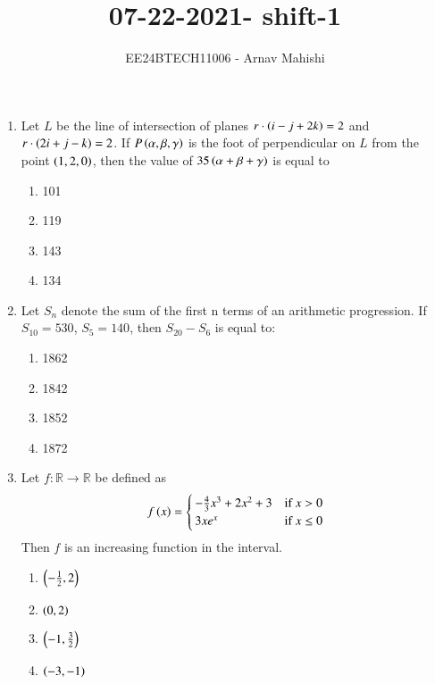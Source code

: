 \documentclass[journal]{IEEEtran}
\begin{document}

\vspace{3cm}

\title{07-22-2021- shift-1}
\author{EE24BTECH11006 - Arnav Mahishi}
{\let\newpage\relax\maketitle}
\begin{enumerate}
\item{
Let $L$ be the line of intersection of planes $r\cdot\left(i-j+2k\right) = 2$ and $r \cdot\left(2i + j - k\right) = 2$. If $P\left(\alpha, \beta, \gamma\right)$ is the foot of perpendicular on $L$ from the point $\left(1, 2, 0\right)$, then the value of $35\left(\alpha + \beta + \gamma\right)$ is equal to
\begin{multicols}{4}
\begin{enumerate}
\item101
\item119
\item143
\item134
\end{enumerate}
\end{multicols}
}
\item{
Let $S_n$ denote the sum of the first n terms of an arithmetic progression. If $S_{10} = 530$, $S_5 = 140$, then 
$S_{20} - S_6$ is equal to:
\begin{multicols}{4}
\begin{enumerate}
\item 1862
\item 1842
\item 1852
\item 1872
\end{enumerate}
\end{multicols}}
\item{
Let $f : \mathbb{R} \rightarrow \mathbb{R}$ be defined as
\[ f\left(x\right) = \begin{cases} 
-\frac{4}{3}x^3 + 2x^2 + 3 & \text{if } x > 0 \\
3xe^x & \text{if } x \leq 0 
\end{cases} \]
Then $f$ is an increasing function in the interval.
\begin{multicols}{4}
\begin{enumerate}
\item $\left(-\frac{1}{2}, 2\right)$
\item $\left(0,2\right)$
\item $\left(-1,\frac{3}{2}\right)$
\item $\left(-3,-1\right)$

\end{enumerate}
\end{multicols}}
\end{enumerate}
\end{document}

